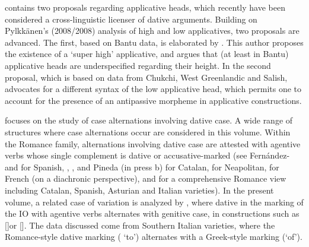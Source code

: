 \documentclass[output=paper,modfonts,nonflat]{langsci/langscibook}
\begin{document}
\begin{styleListNumberi}
contains two proposals regarding applicative heads, which recently have been considered a cross-linguistic licenser of dative arguments. Building on Pylkkänen’s (2008/2008) analysis of high and low applicatives, two proposals are advanced. The first, based on Bantu data, is elaborated by . This author proposes the existence of a ‘super high’ applicative, and argues that (at least in Bantu) applicative heads are underspecified regarding their height. In the second proposal, which is based on data from Chukchi, West Greenlandic and Salish, advocates for a different syntax of the low applicative head, which permits one to account for the presence of an antipassive morpheme in applicative constructions. 
\end{styleListNumberi}

\begin{styleListNumberi}
 focuses on the study of case alternations involving dative case. A wide range of structures where case alternations occur are considered in this volume. Within the Romance family, alternations involving dative case are attested with agentive verbs whose single complement is dative or accusative-marked (see Fernández-\citet{Ordóñez1999} and \citet{Sáez2009} for Spanish, \citet{Ramos2005}, \citet{Morant2008}, \citet{PinedaRoyo2017} and Pineda (in press b) for Catalan, \citet{Ledgeway2000} for Neapolitan, \citet{Troberg2008} for French (on a diachronic perspective), and \citet{Pineda2016} for a comprehensive Romance view including Catalan, Spanish, Asturian and Italian varieties). In the present volume, a related case of variation is analyzed by , where dative in the marking of the IO with agentive verbs alternates with genitive case, in constructions such as []or []. The data discussed come from Southern Italian varieties, where the Romance-style dative marking ( ‘to’) alternates with a Greek-style marking (‘of’). 
\end{styleListNumberi}
\end{document}
